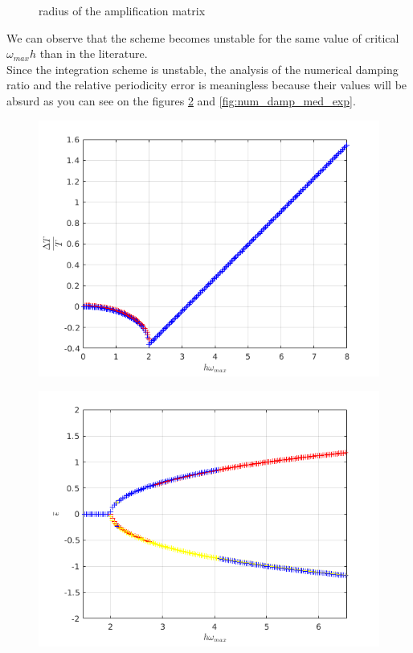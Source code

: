 \begin{itemize}
\begin{figure}[H]
  \caption{radius of the amplification matrix}
  \label{fig:spect_rad_med_exp}
\end{figure}
We can observe that the scheme becomes unstable for the same value of critical $\omega_{max} h$ than in the literature. \\
Since the integration scheme is unstable, the analysis of the numerical damping ratio and the relative periodicity error is meaningless because their values will be absurd as you can see on the figures \ref{fig:rel_per_err_med_exp} and \ref{fig:num_damp_med_exp}.  
\begin{figure}[H]
\centering
\begin{minipage}{.5\textwidth}
  \centering
  \includegraphics[width=.98\linewidth]{images/rel_per_err_med_exp.png}
  \label{fig:rel_per_err_med_exp}
\end{minipage}%
\begin{minipage}{.5\textwidth}
  \centering
  \includegraphics[width=.98\linewidth]{images/num_damp_med_exp.png}

\end{minipage}
\end{figure}
\end{itemize}
